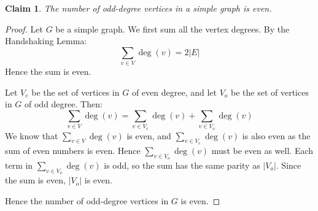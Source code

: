 \documentclass{article}
\newtheorem*{claim}{Claim}
\begin{document}
\begin{claim}
    The number of odd-degree vertices in a simple graph is even.
\end{claim}

\begin{proof}
    Let $G$ be a simple graph. We first sum all the vertex degrees. By the Handshaking Lemma:
    \[
    \sum_{v \in V} \deg(v) = 2|E|
    \]
    Hence the sum is even.

    \medskip

    Let $V_e$ be the set of vertices in $G$ of even degree, and let $V_o$ be the set of vertices 
    in $G$ of odd degree. Then:
    \[
    \sum_{v \in V} \deg(v) = \sum_{v \in V_e} \deg(v) + \sum_{v \in V_o} \deg(v)
    \]
    We know that $\sum_{v \in V} \deg(v)$ is even, and $\sum_{v \in V_e} \deg(v)$ is also even 
    as the sum of even numbers is even. Hence $\sum_{v \in V_o} \deg(v)$ must be even as well.
    Each term in $\sum_{v \in V_o} \deg(v)$ is odd, so the sum has the same parity as $|V_o|$. 
    Since the sum is even, $|V_o|$ is even.

    \medskip

    Hence the number of odd-degree vertices in $G$ is even.
\end{proof}
\end{document}
